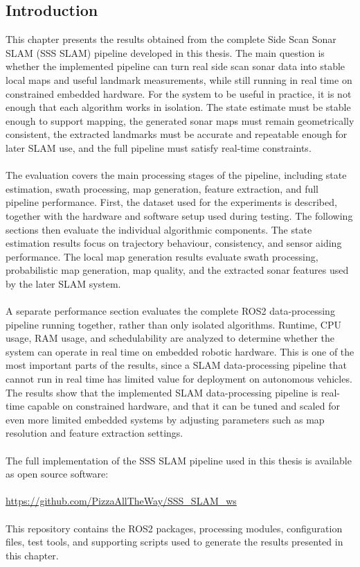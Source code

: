 \subsection{Introduction}
This chapter presents the results obtained from the complete Side Scan Sonar SLAM (SSS SLAM) pipeline developed in this thesis. The main question is whether the implemented pipeline can turn real side scan sonar data into stable local maps and useful landmark measurements, while still running in real time on constrained embedded hardware. For the system to be useful in practice, it is not enough that each algorithm works in isolation. The state estimate must be stable enough to support mapping, the generated sonar maps must remain geometrically consistent, the extracted landmarks must be accurate and repeatable enough for later SLAM use, and the full pipeline must satisfy real-time constraints.
\\ \\
The evaluation covers the main processing stages of the pipeline, including state estimation, swath processing, map generation, feature extraction, and full pipeline performance. First, the dataset used for the experiments is described, together with the hardware and software setup used during testing. The following sections then evaluate the individual algorithmic components. The state estimation results focus on trajectory behaviour, consistency, and sensor aiding performance. The local map generation results evaluate swath processing, probabilistic map generation, map quality, and the extracted sonar features used by the later SLAM system.
\\ \\
A separate performance section evaluates the complete ROS2 data-processing pipeline running together, rather than only isolated algorithms. Runtime, CPU usage, RAM usage, and schedulability are analyzed to determine whether the system can operate in real time on embedded robotic hardware. This is one of the most important parts of the results, since a SLAM data-processing pipeline that cannot run in real time has limited value for deployment on autonomous vehicles. The results show that the implemented SLAM data-processing pipeline is real-time capable on constrained hardware, and that it can be tuned and scaled for even more limited embedded systems by adjusting parameters such as map resolution and feature extraction settings.
\\ \\
The full implementation of the SSS SLAM pipeline used in this thesis is available as open source software:
\\ \\
\url{https://github.com/PizzaAllTheWay/SSS_SLAM_ws} \cite{SSS_SLAM_repo}
\\ \\
This repository contains the ROS2 packages, processing modules, configuration files, test tools, and supporting scripts used to generate the results presented in this chapter.